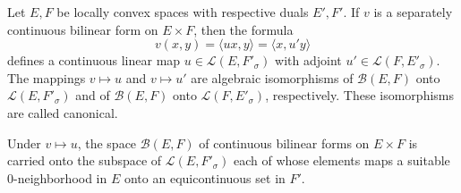 Let $E, F$ be locally convex spaces with respective duals $E', F'$. If $v$ is a separately continuous bilinear form on $E \times F$, then the formula
$$v(x, y) = \langle ux, y \rangle = \langle x, u'y \rangle$$
defines a continuous linear map $u \in \mathcal{L}(E, F'_\sigma)$ with adjoint $u' \in \mathcal{L}(F, E'_\sigma)$. The mappings $v \mapsto u$ and $v \mapsto u'$ are algebraic isomorphisms of $\mathcal{B}(E, F)$ onto $\mathcal{L}(E, F'_\sigma)$ and of $\mathcal{B}(E, F)$ onto $\mathcal{L}(F, E'_\sigma)$, respectively. These isomorphisms are called canonical.

Under $v \mapsto u$, the space $\mathcal{B}(E, F)$ of continuous bilinear forms on $E \times F$ is carried onto the subspace of $\mathcal{L}(E, F'_\sigma)$ each of whose elements maps a suitable $0$-neighborhood in $E$ onto an equicontinuous set in $F'$.
